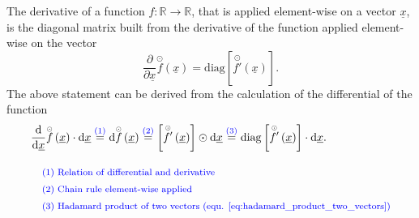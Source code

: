 The derivative of a function
$f:\mathbb{R}\rightarrow\mathbb{R}$, that is applied element-wise on a vector $\underline x$,
is the diagonal matrix built from the derivative of the function applied element-wise on the vector
\begin{equation} \label{eq:derivative_vector_elementwise_applied_function}
        \frac{\partial}{\partial \underline x} 
        \overset{\scriptscriptstyle \odot}{f} \left(
                \underline x
            \right)
    =
        \mathrm{diag} \left[
            \overset{\scriptscriptstyle \odot}{f'}  \left(
                \underline x
            \right)
        \right].
\end{equation}
The above statement can be derived 
from the calculation of the differential of the function
\begin{align}
    &\frac{\text d}{\text d \underline x}
    \overset{\scriptscriptstyle \odot}{f} \left(
        \underline x
    \right)
    \cdot \text d \underline x
\overset{\textcolor{blue}{(1)}}{=}
    \text d 
    \overset{\scriptscriptstyle \odot}{f} \left(
        \underline x
    \right)
\overset{\textcolor{blue}{(2)}}{=}
    \left[
        \overset{\scriptscriptstyle \odot}{f'}  \left(
            \underline x
        \right)
    \right]
    \odot \text d \underline x
\overset{\textcolor{blue}{(3)}}{=}
    \mathrm{diag} \left[
        \overset{\scriptscriptstyle \odot}{f'}  \left(
            \underline x
        \right)
    \right]\cdot
    \text d \underline x.
    \\[2ex]
        &\quad\textcolor{blue}{\text{\footnotesize (1) Relation of differential and derivative}} \nonumber \\
        &\quad\textcolor{blue}{\text{\footnotesize (2) Chain rule element-wise applied}} \nonumber \\
        &\quad\textcolor{blue}{\text{\footnotesize (3) Hadamard product of two vectors (equ. \ref{eq:hadamard_product_two_vectors})}}
\end{align}